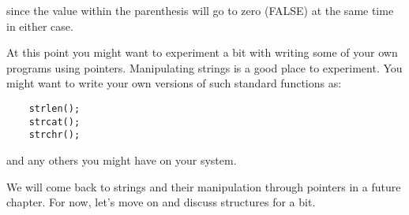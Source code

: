 since the value within the parenthesis will go to zero (FALSE) at the
same time in either case.

At this point you might want to experiment a bit with writing some of
your own programs using pointers. Manipulating strings is a good place
to experiment. You might want to write your own versions of such
standard functions as:

\begin{verbatim}
    strlen();
    strcat();
    strchr();
\end{verbatim}

and any others you might have on your system.

We will come back to strings and their manipulation through pointers in
a future chapter. For now, let's move on and discuss structures for a
bit.

\begin{comment}
\href{ch5x.htm}{Chapter 5: Pointers and Structures}

\href{pointers.htm}{Back to Table of Contents}
\end{comment}
